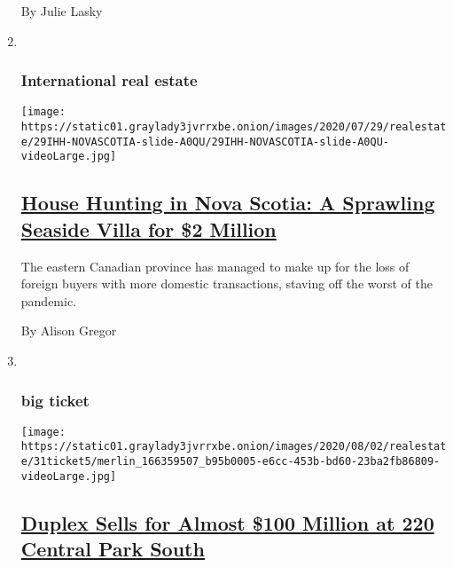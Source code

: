 \begin{enumerate}
  By Julie Lasky
\item ~
  \hypertarget{international-real-estate}{%
  \subsubsection{International real
  estate}\label{international-real-estate}}

  \texttt{[image: https://static01.graylady3jvrrxbe.onion/images/2020/07/29/realestate/29IHH-NOVASCOTIA-slide-A0QU/29IHH-NOVASCOTIA-slide-A0QU-videoLarge.jpg]}

  \hypertarget{house-hunting-in-nova-scotia-a-sprawling-seaside-villa-for-2-million}{%
  \subsection{\texorpdfstring{\href{/2020/07/29/realestate/house-hunting-in-nova-scotia-a-sprawling-seaside-villa-for-2-million.html}{House
  Hunting in Nova Scotia: A Sprawling Seaside Villa for \$2
  Million}}{House Hunting in Nova Scotia: A Sprawling Seaside Villa for \$2 Million}}\label{house-hunting-in-nova-scotia-a-sprawling-seaside-villa-for-2-million}}

  The eastern Canadian province has managed to make up for the loss of
  foreign buyers with more domestic transactions, staving off the worst
  of the pandemic.

  By Alison Gregor
\item ~
  \hypertarget{big-ticket}{%
  \subsubsection{big ticket}\label{big-ticket}}

  \texttt{[image: https://static01.graylady3jvrrxbe.onion/images/2020/08/02/realestate/31ticket5/merlin\_166359507\_b95b0005-e6cc-453b-bd60-23ba2fb86809-videoLarge.jpg]}

  \hypertarget{duplex-sells-for-almost-100-million-at-220-central-park-south}{%
  \subsection{\texorpdfstring{\href{/2020/07/28/realestate/duplex-sells-for-almost-100-million-at-220-central-park-south.html}{Duplex
  Sells for Almost \$100 Million at 220 Central Park
  South}}{Duplex Sells for Almost \$100 Million at 220 Central Park South}}\label{duplex-sells-for-almost-100-million-at-220-central-park-south}}


\end{enumerate}

